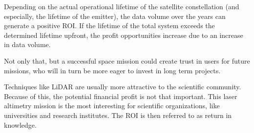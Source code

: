 Depending on the actual operational lifetime of the satellite constellation (and especially, the lifetime of the emitter), the data volume over the years can generate a positive \acs{ROI}. If the lifetime of the total system exceeds the determined lifetime upfront, the profit opportunities increase due to an increase in data volume. 

Not only that, but a successful space mission could create trust in users for future missions, who will in turn be more eager to invest in long term projects.

Techniques like \acs{LiDAR} are usually more attractive to the scientific community. Because of this, the potential financial profit is not that important. This \acs{laser} altimetry mission is the most interesting for scientific organizations, like universities and research institutes. The \acs{ROI} is then referred to as return in knowledge.  